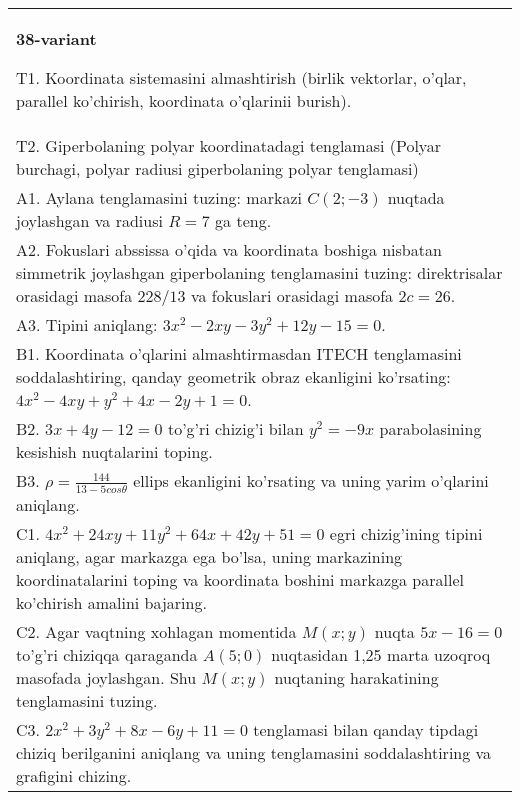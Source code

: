 \documentclass{article}
\begin{document}
\begin{tabular}{m{17cm}}
\textbf{38-variant}
\newline

T1. Koordinata sistemasini almashtirish (birlik vektorlar, o'qlar, parallel ko'chirish, koordinata o'qlarinii burish).\\

T2. Giperbolaning polyar koordinatadagi tenglamasi (Polyar burchagi, polyar radiusi giperbolaning polyar tenglamasi)\\

A1. Aylana tenglamasini tuzing: markazi $C(2;-3)$ nuqtada joylashgan va radiusi $R=7$ ga teng.\\

A2. Fokuslari abssissa o'qida va koordinata boshiga nisbatan simmetrik joylashgan giperbolaning tenglamasini tuzing: direktrisalar orasidagi masofa $228/13$ va fokuslari orasidagi masofa $2c=26$.\\

A3. Tipini aniqlang: $3x^{2}-2xy-3y^{2}+12y-15=0$.\\

B1. Koordinata o'qlarini almashtirmasdan ITECH tenglamasini soddalashtiring, qanday geometrik obraz ekanligini ko'rsating: $4x^{2} - 4xy + y^{2} + 4x - 2y + 1 = 0$.  \\

B2. $3x + 4y - 12 = 0$ to'g'ri chizig'i bilan $y^{2} = - 9x$ parabolasining kesishish nuqtalarini toping.  \\

B3. $\rho = \frac{144}{13 - 5cos\theta}$ ellips ekanligini ko'rsating va uning yarim o'qlarini aniqlang.\\

C1. $4x^{2} + 24xy + 11y^{2} + 64x + 42y + 51 = 0$ egri chizig'ining tipini aniqlang, agar markazga ega bo'lsa, uning markazining koordinatalarini toping va koordinata boshini markazga parallel ko'chirish amalini bajaring.\\

C2. Agar vaqtning xohlagan momentida $M(x;y)$ nuqta $5x - 16 = 0$ to'g'ri chiziqqa qaraganda $A(5;0)$ nuqtasidan 1,25 marta uzoqroq masofada joylashgan. Shu $M(x;y)$ nuqtaning harakatining tenglamasini tuzing.  \\

C3. $2x^{2} + 3y^{2} + 8x - 6y + 11 = 0$ tenglamasi bilan qanday tipdagi chiziq berilganini aniqlang va uning tenglamasini soddalashtiring va grafigini chizing.  \\

\end{tabular}
\vspace{1cm}
\end{document}
